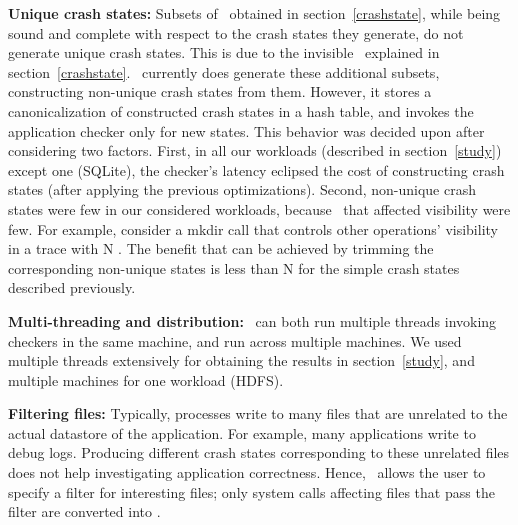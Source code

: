 
\noindent\textbf{Unique crash states:} Subsets of \microinstructions\ obtained in section~\ref{crashstate}, while being sound and complete with respect to the crash states they generate, do not generate unique crash states. This is due to the invisible \microinstructions\ explained in section~\ref{crashstate}. \Kassandra\ currently does generate these additional subsets, constructing non-unique crash states from them. However, it stores a canonicalization of constructed crash states in a hash table, and invokes the application checker only for new states. This behavior was decided upon after considering two factors. First, in all our workloads (described in section~\ref{study}) except one (SQLite), the checker's latency eclipsed the cost of constructing crash states (after applying the previous optimizations). Second, non-unique crash states were few in our considered workloads, because \microinstructions\ that affected visibility were few. For example, consider a mkdir call that controls other operations' visibility in a trace with N \microinstructions. The benefit that can be achieved by trimming the corresponding non-unique states is less than N for the simple crash states described previously. %

\noindent\textbf{Multi-threading and distribution:} \Kassandra\ can both run multiple threads invoking checkers in the same machine, and run across multiple machines. We used multiple threads extensively for obtaining the results in section~\ref{study}, and multiple machines for one workload (HDFS).

\noindent\textbf{Filtering files:} Typically, processes write to many files that are unrelated to the actual datastore of the application. For example, many applications write to debug logs. Producing different crash states corresponding to these unrelated files does not help investigating application correctness. Hence, \Kassandra\ allows the user to specify a filter for interesting files; only system calls affecting files that pass the filter are converted into \microinstructions.

